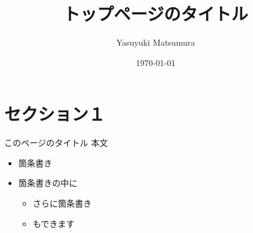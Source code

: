 \documentclass[xcolor=svgnames,dvipdfmx,cjk]{beamer}
\theoremstyle{example}
\begin{document}
 

\title[足元表示のタイトル]{トップページのタイトル} 
\author[Y. Matsumura]{Yasuyuki Matsumura}          
\date{\today}


\begin{frame}                  
\titlepage                     
\end{frame}


\begin{frame}                  
\tableofcontents
\end{frame}


\section{セクション１}

\begin{frame}{このページのタイトル}
  本文
  \begin{itemize}
    \item 箇条書き
    \item 箇条書きの中に
    \begin{itemize}
      \item さらに箇条書き
      \item もできます
    \end{itemize}
  \end{itemize}
\end{frame}
\end{document}
